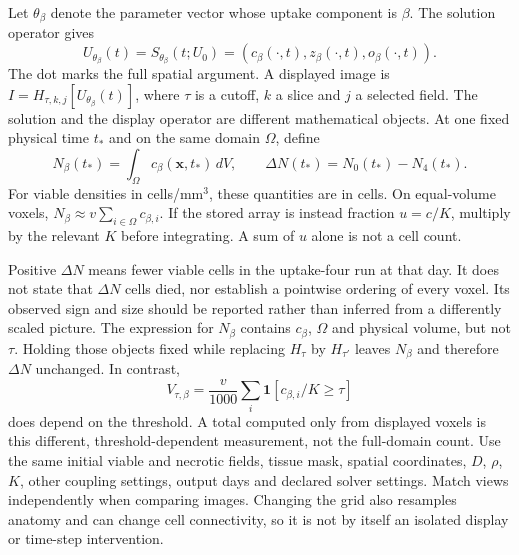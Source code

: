 Let $\theta_\beta$ denote the parameter vector whose uptake component is $\beta$. The solution operator gives
\[
U_{\theta_\beta}(t)=S_{\theta_\beta}(t;U_0)
=(c_\beta(\cdot,t),z_\beta(\cdot,t),o_\beta(\cdot,t)).
\]
The dot marks the full spatial argument. A displayed image is $I=H_{\tau,k,j}[U_{\theta_\beta}(t)]$, where $\tau$ is a cutoff, $k$ a slice and $j$ a selected field. The solution and the display operator are different mathematical objects.
At one fixed physical time $t_*$ and on the same domain $\Omega$, define
\[
N_\beta(t_*)=\int_\Omega c_\beta(\mathbf x,t_*)\,dV,
\qquad \Delta N(t_*)=N_0(t_*)-N_4(t_*).
\]
For viable densities in cells/mm$^3$, these quantities are in cells. On equal-volume voxels, $N_\beta\approx v\sum_{i\in\Omega}c_{\beta,i}$. If the stored array is instead fraction $u=c/K$, multiply by the relevant $K$ before integrating. A sum of $u$ alone is not a cell count.

Positive $\Delta N$ means fewer viable cells in the uptake-four run at that day. It does not state that $\Delta N$ cells died, nor establish a pointwise ordering of every voxel. Its observed sign and size should be reported rather than inferred from a differently scaled picture.
The expression for $N_\beta$ contains $c_\beta$, $\Omega$ and physical volume, but not $\tau$. Holding those objects fixed while replacing $H_\tau$ by $H_{\tau'}$ leaves $N_\beta$ and therefore $\Delta N$ unchanged. In contrast,
\[
V_{\tau,\beta}=\frac v{1000}\sum_i\mathbf1[c_{\beta,i}/K\geq\tau]
\]
does depend on the threshold. A total computed only from displayed voxels is this different, threshold-dependent measurement, not the full-domain count.
Use the same initial viable and necrotic fields, tissue mask, spatial coordinates, $D$, $\rho$, $K$, other coupling settings, output days and declared solver settings. Match views independently when comparing images. Changing the grid also resamples anatomy and can change cell connectivity, so it is not by itself an isolated display or time-step intervention.

